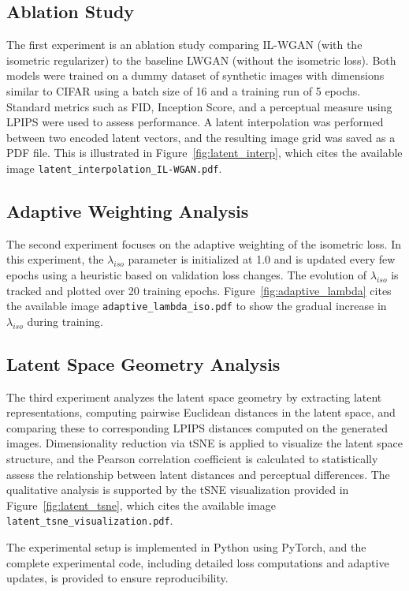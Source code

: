 \documentclass{article} %
\begin{document}
\subsection{Ablation Study}
The first experiment is an ablation study comparing IL-WGAN (with the isometric regularizer) to the baseline LWGAN (without the isometric loss). Both models were trained on a dummy dataset of synthetic images with dimensions similar to CIFAR using a batch size of 16 and a training run of 5 epochs. Standard metrics such as FID, Inception Score, and a perceptual measure using LPIPS were used to assess performance. A latent interpolation was performed between two encoded latent vectors, and the resulting image grid was saved as a PDF file. This is illustrated in Figure~\ref{fig:latent_interp}, which cites the available image \texttt{latent_interpolation_IL-WGAN.pdf}.

\subsection{Adaptive Weighting Analysis}
The second experiment focuses on the adaptive weighting of the isometric loss. In this experiment, the \(\lambda_{iso}\) parameter is initialized at 1.0 and is updated every few epochs using a heuristic based on validation loss changes. The evolution of \(\lambda_{iso}\) is tracked and plotted over 20 training epochs. Figure~\ref{fig:adaptive_lambda} cites the available image \texttt{adaptive_lambda_iso.pdf} to show the gradual increase in \(\lambda_{iso}\) during training.

\subsection{Latent Space Geometry Analysis}
The third experiment analyzes the latent space geometry by extracting latent representations, computing pairwise Euclidean distances in the latent space, and comparing these to corresponding LPIPS distances computed on the generated images. Dimensionality reduction via t\-SNE\cite{CITATION_9} is applied to visualize the latent space structure, and the Pearson correlation coefficient is calculated to statistically assess the relationship between latent distances and perceptual differences. The qualitative analysis is supported by the t\-SNE visualization provided in Figure~\ref{fig:latent_tsne}, which cites the available image \texttt{latent_tsne_visualization.pdf}.

The experimental setup is implemented in Python using PyTorch\cite{CITATION_10}, and the complete experimental code, including detailed loss computations and adaptive updates, is provided to ensure reproducibility.
\end{document}
